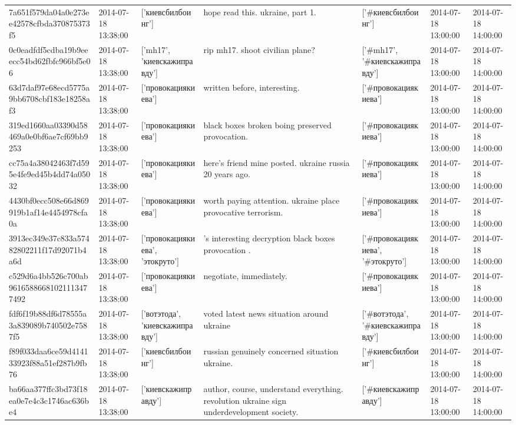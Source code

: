 \begin{tabular}{lllllll}
7a651f579da04a0e273ee42578cfbda370875373f5 & 2014-07-18 13:38:00 & ['киевсбилбоинг'] & hope read this. ukraine, part 1. & ['#киевсбилбоинг'] & 2014-07-18 13:00:00 & 2014-07-18 14:00:00 \\
0c0eadfdf5cdba19b9eeecc54bd62fbfc966bf5e06 & 2014-07-18 13:38:00 & ['mh17', 'киевскажиправду'] & rip mh17. shoot civilian plane? & ['#mh17', '#киевскажиправду'] & 2014-07-18 13:00:00 & 2014-07-18 14:00:00 \\
63d7daf97e68ecd5775a9bb6708cbf183e18258af3 & 2014-07-18 13:38:00 & ['провокациякиева'] & written before, interesting. & ['#провокациякиева'] & 2014-07-18 13:00:00 & 2014-07-18 14:00:00 \\
319ed1660aa03390d58469a0e0bf6ae7cf69bb9253 & 2014-07-18 13:38:00 & ['провокациякиева'] & black boxes broken boing preserved provocation. & ['#провокациякиева'] & 2014-07-18 13:00:00 & 2014-07-18 14:00:00 \\
cc75a4a38042463f7d595e4fe9ed45b4dd74a05032 & 2014-07-18 13:38:00 & ['провокациякиева'] & here's friend mine posted. ukraine russia 20 years ago. & ['#провокациякиева'] & 2014-07-18 13:00:00 & 2014-07-18 14:00:00 \\
4430bf0ecc508e66d869919b1af14e4454978cfa0a & 2014-07-18 13:38:00 & ['провокациякиева'] & worth paying attention. ukraine place provocative terrorism. & ['#провокациякиева'] & 2014-07-18 13:00:00 & 2014-07-18 14:00:00 \\
3913ec349e37c833a57482802211f17d92071b4a6d & 2014-07-18 13:38:00 & ['провокациякиева', 'этокруто'] & 's interesting decryption black boxes provocation . & ['#провокациякиева', '#этокруто'] & 2014-07-18 13:00:00 & 2014-07-18 14:00:00 \\
c529d6a4bb526c700ab96165886681021113477492 & 2014-07-18 13:38:00 & ['провокациякиева'] & negotiate, immediately. & ['#провокациякиева'] & 2014-07-18 13:00:00 & 2014-07-18 14:00:00 \\
fdf6f19b88df6d78555a3a839089b740502e7587f5 & 2014-07-18 13:38:00 & ['вотэтода', 'киевскажиправду'] & voted latest news situation around ukraine & ['#вотэтода', '#киевскажиправду'] & 2014-07-18 13:00:00 & 2014-07-18 14:00:00 \\
f89f033daa6ce59d414133923f88a51ef287b9fb76 & 2014-07-18 13:38:00 & ['киевсбилбоинг'] & russian genuinely concerned situation ukraine. & ['#киевсбилбоинг'] & 2014-07-18 13:00:00 & 2014-07-18 14:00:00 \\
ba66aa377ffc3bd73f18ea0e7e4c3c1746ac636be4 & 2014-07-18 13:38:00 & ['киевскажиправду'] & author, course, understand everything. revolution ukraine sign underdevelopment society. & ['#киевскажиправду'] & 2014-07-18 13:00:00 & 2014-07-18 14:00:00 \\

\end{tabular}

